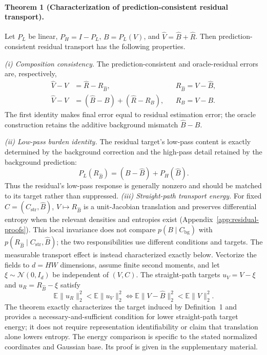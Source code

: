\documentclass[letterpaper]{article}
\newif\ifaaaiwithappendix
\begin{document}
\paragraph{Theorem 1 (Characterization of prediction-consistent residual transport).}
Let $P_L$ be linear, $P_H=I-P_L$, $B=P_L(V)$, and $\hat V=\hat B+\hat R$. Then prediction-consistent residual transport has the following properties.

\textit{(i) Composition consistency.}
The prediction-consistent and oracle-residual errors are, respectively,
\begin{equation}
\begin{aligned}
\hat V-V&=\hat R-R_{\hat B},
&&R_{\hat B}=V-\hat B,\\
\hat V-V&=(\hat B-B)+(\hat R-R_B),
&&R_B=V-B.
\end{aligned}
\label{eq:composition-consistent}
\end{equation}
The first identity makes final error equal to residual estimation error; the oracle construction retains the additive background mismatch $\hat B-B$.

\textit{(ii) Low-pass burden identity.}
The residual target's low-pass content is exactly determined by the background correction and the high-pass detail retained by the background prediction:
\begin{equation}
P_L(R_{\hat B})=(B-\hat B)+P_H(\hat B).
\label{eq:low-frequency-burden}
\end{equation}
Thus the residual's low-pass response is generally nonzero and should be matched to its target rather than suppressed.
\textit{(iii) Straight-path transport energy.}
For fixed $C=(C_{\mathrm{str}},\hat B)$, $V\mapsto R_{\hat B}$ is a unit-Jacobian translation and preserves differential entropy when the relevant densities and entropies exist (Appendix~\ref{app:residual-proofs}). This local invariance does not compare $p(B\mid C_{\mathrm{bg}})$ with $p(R_{\hat B}\mid C_{\mathrm{str}},\hat B)$; the two responsibilities use different conditions and targets. The measurable transport effect is instead characterized exactly below. Vectorize the fields to $d=HW$ dimensions, assume finite second moments, and let $\xi\sim\mathcal N(0,I_d)$ be independent of $(V,C)$. The straight-path targets $u_V=V-\xi$ and $u_R=R_{\hat B}-\xi$ satisfy
\begin{equation}
\mathbb E\|u_R\|_2^2<\mathbb E\|u_V\|_2^2
\iff
\mathbb E\|V-\hat B\|_2^2<\mathbb E\|V\|_2^2.
\label{eq:transport-condition}
\end{equation}
The theorem exactly characterizes the target induced by Definition~1 and provides a necessary-and-sufficient condition for lower straight-path target energy; it does not require representation identifiability or claim that translation alone lowers entropy. The energy comparison is specific to the stated normalized coordinates and Gaussian base. Its proof is given \ifaaaiwithappendix in Appendix~\ref{app:residual-proofs}\else in the supplementary material\fi.
\end{document}
